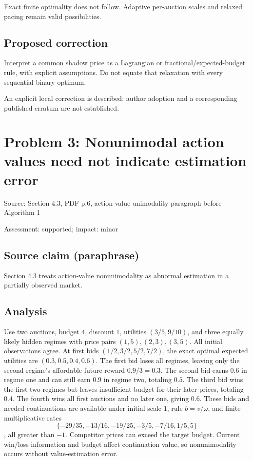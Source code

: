 \documentclass[11pt]{article}
\begin{document}
Exact finite optimality does not follow. Adaptive per-auction scales and relaxed pacing remain valid possibilities.

\subsection*{Proposed correction}

Interpret a common shadow price as a Lagrangian or fractional/expected-budget rule, with explicit assumptions. Do not equate that relaxation with every sequential binary optimum.

An explicit local correction is described; author adoption and a corresponding published erratum are not established.

\section*{Problem 3: Nonunimodal action values need not indicate estimation error}

Source: Section 4.3, PDF p.6, action-value unimodality paragraph before Algorithm 1

Assessment: supported; impact: minor

\subsection*{Source claim (paraphrase)}

Section 4.3 treats action-value nonunimodality as abnormal estimation in a partially observed market.

\subsection*{Analysis}

Use two auctions, budget \(4\), discount \(1\), utilities \((3/5,9/10)\), and three equally likely hidden regimes with price pairs \((1,5),(2,3),(3,5)\). All initial observations agree. At first bids \((1/2,3/2,5/2,7/2)\), the exact optimal expected utilities are \((0.3,0.5,0.4,0.6)\). The first bid loses all regimes, leaving only the second regime’s affordable future reward \(0.9/3=0.3\). The second bid earns \(0.6\) in regime one and can still earn \(0.9\) in regime two, totaling \(0.5\). The third bid wins the first two regimes but leaves insufficient budget for their later prices, totaling \(0.4\). The fourth wins all first auctions and no later one, giving \(0.6\). These bids and needed continuations are available under initial scale \(1\), rule \(b=v/\omega\), and finite multiplicative rates \[\{-29/35,-13/16,-19/25,-3/5,-7/16,1/5,5\}\], all greater than \(-1\). Competitor prices can exceed the target budget. Current win/loss information and budget affect continuation value, so nonunimodality occurs without value-estimation error.
\end{document}
